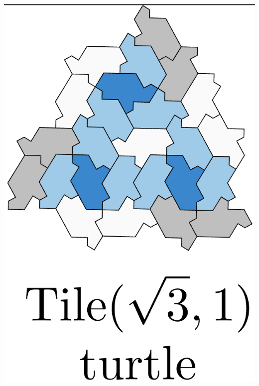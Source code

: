 \documentclass[class=beamer, crop=false]{standalone}
\begin{document}
\begin{minipage}{0.24\textwidth}
  \begin{minipage}[t]{0.24\textwidth}
    \centering
    \includegraphics[width=\linewidth]{images/polykite-family/turtle(sqrt(3),1).png}
  \end{minipage}\hfill
  \begin{minipage}[t]{0.24\textwidth}
    \centering

\end{minipage}
\end{minipage}
\end{document}
